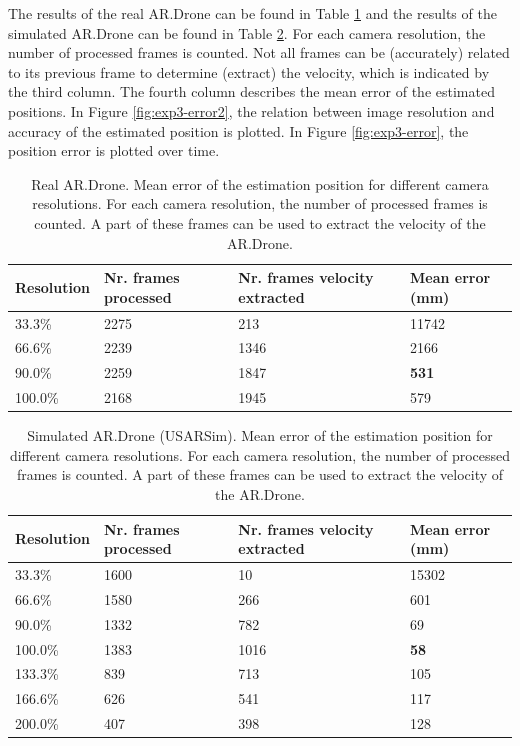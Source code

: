 The results of the real AR.Drone can be found in Table \ref{tab:res-resolution-ar} and the results of the simulated AR.Drone can be found in Table \ref{tab:res-resolution-usar}.
For each camera resolution, the number of processed frames is counted.
Not all frames can be (accurately) related to its previous frame to determine (extract) the velocity, which is indicated by the third column.
The fourth column describes the mean error of the estimated positions.
In Figure \ref{fig:exp3-error2}, the relation between image resolution and accuracy of the estimated position is plotted.
In Figure \ref{fig:exp3-error}, the position error is plotted over time.


\begin{table}[htb!]
    \centering
    \begin{tabular}
        { | l | l | l | l | } 
	\hline
	Resolution & Nr. frames processed & Nr. frames velocity extracted & Mean error (mm) \\
        \hline
        33.3\% & 2275 & 213 & 11742 \\
	66.6\% & 2239 & 1346 & 2166 \\
	90.0\% & 2259 & 1847 & \textbf{531} \\
	100.0\% & 2168 & 1945 & 579 \\
	\hline
    \end{tabular}
    \caption{Real AR.Drone. Mean error of the estimation position for different camera resolutions. For each camera resolution, the number of processed frames is counted. A part of these frames can be used to extract the velocity of the AR.Drone.}
    \label{tab:res-resolution-ar}
\end{table}

\begin{table}[htb!]
    \centering
    \begin{tabular}
        { | l | l | l | l | } 
	\hline
	Resolution & Nr. frames processed & Nr. frames velocity extracted & Mean error (mm) \\
        \hline
        33.3\% & 1600 & 10 & 15302 \\
	66.6\% & 1580 & 266 & 601 \\
	90.0\% & 1332 & 782 & 69 \\
	100.0\% & 1383 & 1016 & \textbf{58} \\
	133.3\% & 839 & 713 & 105 \\
	166.6\% & 626 & 541 & 117 \\
	200.0\% & 407 & 398 & 128 \\
	\hline
    \end{tabular}
    \caption{Simulated AR.Drone (USARSim). Mean error of the estimation position for different camera resolutions. For each camera resolution, the number of processed frames is counted. A part of these frames can be used to extract the velocity of the AR.Drone.}
    \label{tab:res-resolution-usar}
\end{table}


